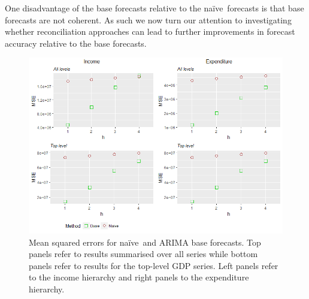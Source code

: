 \documentclass[graybox]{svmult}
\def\naive{na\"{i}ve\ }
\begin{document}
One disadvantage of the base forecasts relative to the \naive forecasts is that base forecasts are not coherent. As such we now turn our attention to investigating whether reconciliation approaches can lead to further improvements in forecast accuracy relative to the base forecasts.


\begin{figure}[t]
	\centering
	\small
	\includegraphics[width=\textwidth]{Figs/Results/NaiveVsBase_MSE.png}
	\caption{Mean squared errors for \naive and ARIMA base forecasts. Top panels refer to results summarised over all series while bottom panels refer to results for the top-level GDP series. Left panels refer to the income hierarchy and right panels to the expenditure hierarchy.}\label{fig: NaiveVsBase_MSE}
\end{figure}


\end{document}
